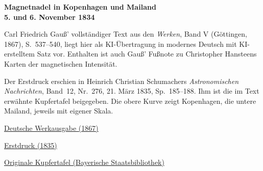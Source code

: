 \clearpage
\thispagestyle{empty}
\begin{center}\Large\textbf{Magnetnadel in Kopenhagen und Mailand\\5. und 6. November 1834}\end{center}

Carl Friedrich Gauß’ vollständiger Text aus den \textit{Werken}, Band V (Göttingen, 1867), S.~537--540, liegt hier als KI-Übertragung in modernes Deutsch mit KI-erstelltem Satz vor. Enthalten ist auch Gauß’ Fußnote zu Christopher Hansteens Karten der magnetischen Intensität.

Der Erstdruck erschien in Heinrich Christian Schumachers \textit{Astronomischen Nachrichten}, Band~12, Nr.~276, 21. März 1835, Sp.~185--188. Ihm ist die im Text erwähnte Kupfertafel beigegeben. Die obere Kurve zeigt Kopenhagen, die untere Mailand, jeweils mit eigener Skala.

\medskip\noindent
\href{https://gdz.sub.uni-goettingen.de/id/PPN236006339}{Deutsche Werkausgabe (1867)}\par
\noindent\href{https://www.digitale-sammlungen.de/view/bsb10049437?page=103}{Erstdruck (1835)}\par
\noindent\href{https://www.digitale-sammlungen.de/view/bsb10049437?page=231}{Originale Kupfertafel (Bayerische Staatsbibliothek)}
\clearpage
